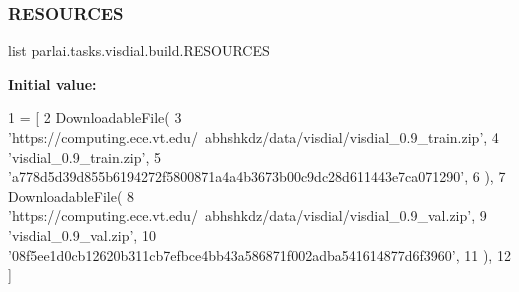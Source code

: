 \subsubsection{\texorpdfstring{R\+E\+S\+O\+U\+R\+C\+ES}{RESOURCES}}
{\footnotesize\ttfamily list parlai.\+tasks.\+visdial.\+build.\+R\+E\+S\+O\+U\+R\+C\+ES}

{\bfseries Initial value\+:}
\begin{DoxyCode}
1 =  [
2     DownloadableFile(
3         \textcolor{stringliteral}{'https://computing.ece.vt.edu/~abhshkdz/data/visdial/visdial\_0.9\_train.zip'},
4         \textcolor{stringliteral}{'visdial\_0.9\_train.zip'},
5         \textcolor{stringliteral}{'a778d5d39d855b6194272f5800871a4a4b3673b00c9dc28d611443e7ca071290'},
6     ),
7     DownloadableFile(
8         \textcolor{stringliteral}{'https://computing.ece.vt.edu/~abhshkdz/data/visdial/visdial\_0.9\_val.zip'},
9         \textcolor{stringliteral}{'visdial\_0.9\_val.zip'},
10         \textcolor{stringliteral}{'08f5ee1d0cb12620b311cb7efbce4bb43a586871f002adba541614877d6f3960'},
11     ),
12 ]
\end{DoxyCode}
